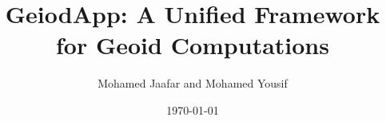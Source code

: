 \documentclass[a4paper, 11pt, oneside]{Thesis}  %
\begin{document}
\frontmatter      %

\title  {GeiodApp: A Unified Framework for Geoid Computations}
\author{Mohamed Jaafar and Mohamed Yousif}
\addresses  {\groupname\\\deptname\\\univname}  %
\date       {\today}
\subject    {}
\keywords   {}

\maketitle


\fancyhead{}  %
\rhead{\thepage}  %
\lhead{}  %

\pagestyle{fancy}  %
\end{document}
